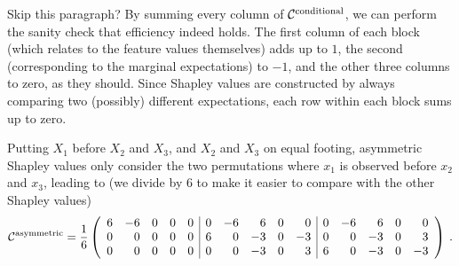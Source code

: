 \documentclass{article}
\newcommand{\bx}{\bar{x}}
\newcommand{\allmeans}{{\cal X}}
\newcommand{\contmat}{{\cal C}}
\newcommand{\boven}[2]{#1^{\mbox{\scriptsize #2}}}
\newcommand{\comment}[1]{{\color{red} #1}}
\begin{document}
\comment{Skip this paragraph?}
By summing every column of $\boven{\contmat}{conditional}$, we can perform the sanity check that efficiency indeed holds. The first column of each block (which relates to the feature values themselves) adds up to $1$, the second (corresponding to the marginal expectations) to $-1$, and the other three columns to zero, as they should. Since Shapley values are constructed by always comparing two (possibly) different expectations, each row within each block sums up to zero.


Putting $X_1$ before $X_2$ and $X_3$, and $X_2$ and $X_3$ on equal footing, asymmetric Shapley values only consider the two permutations where $x_1$ is observed before $x_2$ and $x_3$, leading to (we divide by 6 to make it easier to compare with the other Shapley values)
\[
\boven{\contmat}{asymmetric} = {1 \over 6} \left(\begin{array}{rrrrr|rrrrr|rrrrr}
6 & -6 & 0 & 0 & 0  &
0 & -6 & 6 & 0 & 0  &
0 & -6 & 6 & 0 & 0 \\ 
0 & 0 & 0 & 0 & 0  &
6 & 0 & -3 & 0 & -3  &
0 & 0 & -3 & 0 & 3 \\ 
0 & 0 & 0 & 0 & 0  &
0 & 0 & -3 & 0 & 3  &
6 & 0 & -3 & 0 & -3
\end{array}\right) \: .
\]
\end{document}

